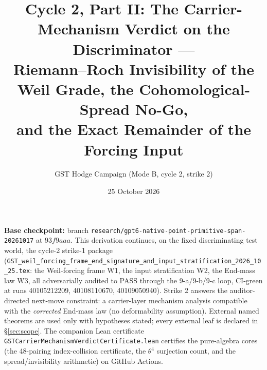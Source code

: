 \documentclass[11pt]{article}
\title{Cycle 2, Part II: The Carrier-Mechanism Verdict on the Discriminator ---\\
Riemann--Roch Invisibility of the Weil Grade, the Cohomological-Spread No-Go,\\
and the Exact Remainder of the Forcing Input}
\author{GST Hodge Campaign (Mode B, cycle 2, strike 2)}
\date{25 October 2026}
\begin{document}
\maketitle

\noindent\textbf{Base checkpoint:} branch \texttt{research/gpt6-native-point-primitive-span-20261017} at
$93f9aaa$. This derivation continues, on the fixed discriminating test world, the cycle-2 strike-1 package
(\texttt{GST\_weil\_forcing\_frame\_end\_signature\_and\_input\_stratification\_2026\_10\_25.tex}: the
Weil-forcing frame W1, the input stratification W2, the End-mass law W3, all adversarially audited to
PASS through the 9-a/9-b/9-c loop, CI-green at runs 40105212209, 40108110670, 40109050940). Strike 2
answers the auditor-directed next-move constraint: a carrier-layer mechanism analysis compatible with the
\emph{corrected} End-mass law (no deformability assumption). External named theorems are used only with
hypotheses stated; every external leaf is declared in \S\ref{sec:scope}. The companion Lean certificate
\texttt{GSTCarrierMechanismVerdictCertificate.lean} certifies the pure-algebra cores (the 48-pairing
index-collision certificate, the $\theta^4$ surjection count, and the spread/invisibility arithmetic)
on GitHub Actions.
\end{document}
